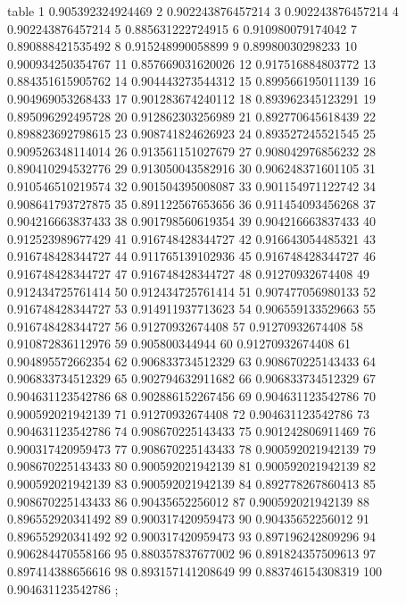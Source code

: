 table {%
	1 0.905392324924469
	2 0.902243876457214
	3 0.902243876457214
	4 0.902243876457214
	5 0.885631222724915
	6 0.910980079174042
	7 0.890888421535492
	8 0.915248990058899
	9 0.89980030298233
	10 0.900934250354767
	11 0.857669031620026
	12 0.917516884803772
	13 0.884351615905762
	14 0.904443273544312
	15 0.899566195011139
	16 0.904969053268433
	17 0.901283674240112
	18 0.893962345123291
	19 0.895096292495728
	20 0.912862303256989
	21 0.892770645618439
	22 0.898823692798615
	23 0.908741824626923
	24 0.893527245521545
	25 0.909526348114014
	26 0.913561151027679
	27 0.908042976856232
	28 0.890410294532776
	29 0.913050043582916
	30 0.906248371601105
	31 0.910546510219574
	32 0.901504395008087
	33 0.901154971122742
	34 0.908641793727875
	35 0.891122567653656
	36 0.911454093456268
	37 0.904216663837433
	38 0.901798560619354
	39 0.904216663837433
	40 0.912523989677429
	41 0.916748428344727
	42 0.916643054485321
	43 0.916748428344727
	44 0.911765139102936
	45 0.916748428344727
	46 0.916748428344727
	47 0.916748428344727
	48 0.91270932674408
	49 0.912434725761414
	50 0.912434725761414
	51 0.907477056980133
	52 0.916748428344727
	53 0.914911937713623
	54 0.906559133529663
	55 0.916748428344727
	56 0.91270932674408
	57 0.91270932674408
	58 0.910872836112976
	59 0.905800344944
	60 0.91270932674408
	61 0.904895572662354
	62 0.906833734512329
	63 0.908670225143433
	64 0.906833734512329
	65 0.902794632911682
	66 0.906833734512329
	67 0.904631123542786
	68 0.902886152267456
	69 0.904631123542786
	70 0.900592021942139
	71 0.91270932674408
	72 0.904631123542786
	73 0.904631123542786
	74 0.908670225143433
	75 0.901242806911469
	76 0.900317420959473
	77 0.908670225143433
	78 0.900592021942139
	79 0.908670225143433
	80 0.900592021942139
	81 0.900592021942139
	82 0.900592021942139
	83 0.900592021942139
	84 0.892778267860413
	85 0.908670225143433
	86 0.90435652256012
	87 0.900592021942139
	88 0.896552920341492
	89 0.900317420959473
	90 0.90435652256012
	91 0.896552920341492
	92 0.900317420959473
	93 0.897196242809296
	94 0.906284470558166
	95 0.880357837677002
	96 0.891824357509613
	97 0.897414388656616
	98 0.893157141208649
	99 0.883746154308319
	100 0.904631123542786
};
